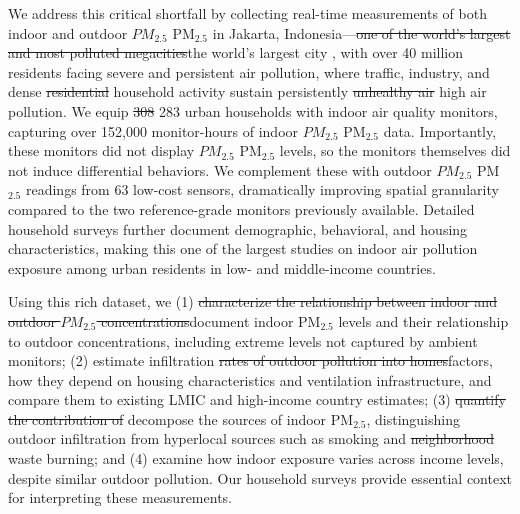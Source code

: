 \documentclass[reqno,12pt,notitlepage]{article}
\providecommand{\DIFadd}[1]{{\protect\color{BLUE}#1}} %
\providecommand{\DIFdel}[1]{{\protect\color{red}\sout{#1}}} %
\providecommand{\DIFaddbegin}{} %
\providecommand{\DIFaddend}{} %
\providecommand{\DIFdelbegin}{} %
\providecommand{\DIFdelend}{} %
\begin{document}
We address this critical shortfall by collecting real-time measurements of both indoor and outdoor \DIFdelbegin \DIFdel{$PM_{2.5}$ }\DIFdelend \DIFaddbegin \DIFadd{PM$_{2.5}$ }\DIFaddend in Jakarta, Indonesia---\DIFdelbegin \DIFdel{one of the world's largest and most polluted megacities}\DIFdelend \DIFaddbegin \DIFadd{the world's largest city \citep{undesa2025wup}, with over 40 million residents facing severe and persistent air pollution}\DIFaddend , where traffic, industry, and dense \DIFdelbegin \DIFdel{residential }\DIFdelend \DIFaddbegin \DIFadd{household }\DIFaddend activity sustain persistently \DIFdelbegin \DIFdel{unhealthy air }\DIFdelend \DIFaddbegin \DIFadd{high air pollution}\DIFaddend . We equip \DIFdelbegin \DIFdel{308 }\DIFdelend \DIFaddbegin \DIFadd{283 }\DIFaddend urban households with indoor air quality monitors, capturing over 152,000 monitor-hours of indoor \DIFdelbegin \DIFdel{$PM_{2.5}$ }\DIFdelend \DIFaddbegin \DIFadd{PM$_{2.5}$ }\DIFaddend data. Importantly, these monitors did not display \DIFdelbegin \DIFdel{$PM_{2.5}$ }\DIFdelend \DIFaddbegin \DIFadd{PM$_{2.5}$ }\DIFaddend levels, so the monitors themselves did not induce differential behaviors. We complement these with outdoor \DIFdelbegin \DIFdel{$PM_{2.5}$ }\DIFdelend \DIFaddbegin \DIFadd{PM$_{2.5}$ }\DIFaddend readings from 63 low-cost sensors, dramatically improving spatial granularity compared to the two reference-grade monitors previously available. Detailed household surveys further document demographic, behavioral, and housing characteristics, making this one of the largest studies on indoor air pollution exposure among urban residents in low- and middle-income countries. 

Using this rich dataset, we (1) \DIFdelbegin \DIFdel{characterize the relationship between indoor and outdoor $PM_{2.5}$ concentrations}\DIFdelend \DIFaddbegin \DIFadd{document indoor PM$_{2.5}$ levels and their relationship to outdoor concentrations, including extreme levels not captured by ambient monitors}\DIFaddend ; (2) estimate infiltration \DIFdelbegin \DIFdel{rates of outdoor pollution into homes}\DIFdelend \DIFaddbegin \DIFadd{factors, how they depend on housing characteristics and ventilation infrastructure, and compare them to existing LMIC and high-income country estimates}\DIFaddend ; (3) \DIFdelbegin \DIFdel{quantify the contribution of }\DIFdelend \DIFaddbegin \DIFadd{decompose the sources of indoor PM$_{2.5}$, distinguishing outdoor infiltration from }\DIFaddend hyperlocal sources such as smoking and \DIFdelbegin \DIFdel{neighborhood }\DIFdelend waste burning; and (4) examine how indoor exposure varies across income levels\DIFaddbegin \DIFadd{, despite similar outdoor pollution}\DIFaddend . Our household surveys provide essential context for interpreting these measurements. 
\end{document}
